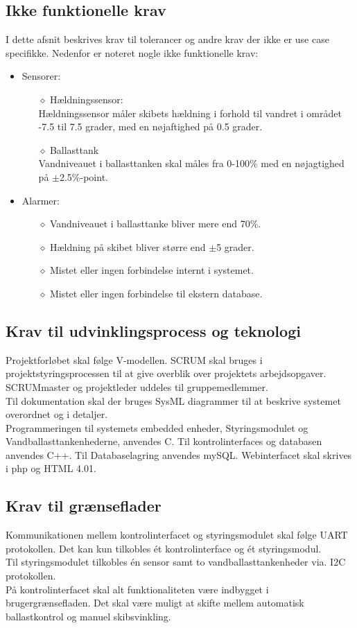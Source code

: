 \subsection{Ikke funktionelle krav}
I dette afsnit beskrives krav til tolerancer og andre krav der ikke er use case specifikke. Nedenfor er noteret nogle ikke funktionelle krav:
\begin{itemize}
\item Sensorer:
\begin{itemize}
\item[$\diamond$] Hældningssensor:\\
Hældningssensor måler skibets hældning i forhold til vandret i området -7.5 til 7.5 grader, med en nøjaftighed på 0.5 grader.\\
\item[$\diamond$] Ballasttank\\
Vandniveauet i ballasttanken skal måles fra 0-100\% med en nøjagtighed på $\pm$2.5\%-point.
\end{itemize}
\item Alarmer:
\begin{itemize}
\item[$\diamond$]Vandniveauet i ballasttanke bliver mere end 70\%.
\item[$\diamond$]Hældning på skibet bliver større end $\pm$5 grader.
\item[$\diamond$]Mistet eller ingen forbindelse internt i systemet.
\item[$\diamond$]Mistet eller ingen forbindelse til ekstern database.
\end{itemize}
\end{itemize}
\subsection{Krav til udvinklingsprocess og teknologi}
Projektforløbet skal følge V-modellen. SCRUM skal bruges i projektstyringsprocessen til at give overblik over projektets arbejdsopgaver. SCRUMmaster og projektleder uddeles til gruppemedlemmer.\\
Til dokumentation skal der bruges SysML diagrammer til at beskrive systemet overordnet og i detaljer.\\
Programmeringen til systemets embedded enheder, Styringsmodulet og Vandballasttankenhederne, anvendes C. Til kontrolinterfaces og databasen anvendes C++. Til Databaselagring anvendes mySQL. Webinterfacet skal skrives i php og HTML 4.01.

\subsection{Krav til grænseflader}
Kommunikationen mellem kontrolinterfacet og styringsmodulet skal følge UART protokollen. Det kan kun tilkobles ét kontrolinterface og ét styringsmodul.\\
Til styringsmodulet tilkobles én sensor samt to vandballasttankenheder via. I2C protokollen.\\
På kontrolinterfacet skal alt funktionaliteten være indbygget i brugergrænsefladen. Det skal være muligt at skifte mellem automatisk ballastkontrol og manuel skibsvinkling. 

